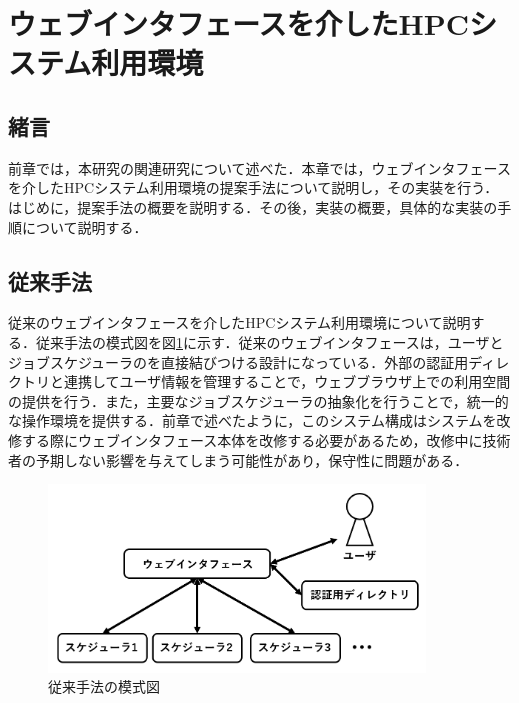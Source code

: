 
\section{ウェブインタフェースを介したHPCシステム利用環境}

\subsection{緒言}
前章では，本研究の関連研究について述べた．本章では，ウェブインタフェースを介したHPCシステム利用環境の提案手法について説明し，その実装を行う．はじめに，提案手法の概要を説明する．その後，実装の概要，具体的な実装の手順について説明する．\par

\subsection{従来手法}
従来のウェブインタフェースを介したHPCシステム利用環境について説明する．従来手法の模式図を図\ref{fig5}に示す．従来のウェブインタフェースは，ユーザとジョブスケジューラのを直接結びつける設計になっている．外部の認証用ディレクトリと連携してユーザ情報を管理することで，ウェブブラウザ上での利用空間の提供を行う．また，主要なジョブスケジューラの抽象化を行うことで，統一的な操作環境を提供する．前章で述べたように，このシステム構成はシステムを改修する際にウェブインタフェース本体を改修する必要があるため，改修中に技術者の予期しない影響を与えてしまう可能性があり，保守性に問題がある．\par

\begin{figure}[tb]
    \centering
    \includegraphics[width=100mm]{./fig/conventional_method.png}
    \caption{従来手法の模式図}
    \label{fig5}
\end{figure}

